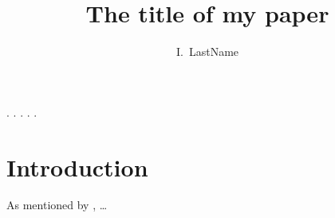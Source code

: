 \documentclass{aa}
\begin{document}
\title{The title of my paper}

\author{
  I.~LastName \inst{\ref{inst}} 
}


\abstract%
    {.}
    {.}
    {.}
    {.}
    {.}




\maketitle

\section{Introduction}

As mentioned by \cite{einstein:1905:EBK}, \ldots



\end{document}
